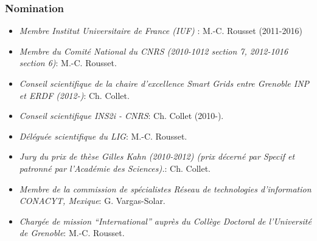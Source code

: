 \subsubsection*{Nomination}
\begin{itemize}

\setlength{\itemindent}{-0.5cm}
\setlength{\itemsep}{-0.1cm}

\item {\it Membre  Institut Universitaire de France (IUF) }: M.-C. Rousset (2011-2016)

\item {\it Membre  du Comit\'e National du CNRS (2010-1012 section 7, 2012-1016 section 6)}: M.-C. Rousset.

\item {\it Conseil scientifique de la chaire d'excellence Smart Grids entre Grenoble INP et ERDF (2012-)}: Ch. Collet.


\item {\it Conseil scientifique INS2i - CNRS}: Ch. Collet (2010-).

\item {\it D\'el\'egu\'ee scientifique du LIG}: M.-C. Rousset.

\item {\it Jury du prix de th{\`e}se Gilles Kahn (2010-2012) (prix d{\'e}cern{\'e} par Specif et patronn{\'e} par l'Acad{\'e}mie des Sciences).}: Ch. Collet.

\item {\it Membre de la commission de sp{\'e}cialistes R{\'e}seau de technologies d'information CONACYT, Mexique}: G. Vargas-Solar.

\item {\it Charg\'ee de mission ``International'' aupr\`es du Coll\`ege Doctoral de l'Universit\'e de Grenoble}: M.-C. Rousset.

 



\end{itemize}


